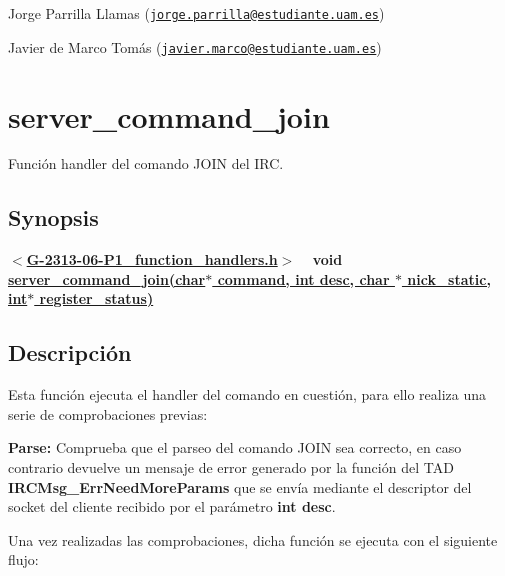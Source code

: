 \begin{DoxyItemize}
\item Jorge Parrilla Llamas (\href{mailto:jorge.parrilla@estudiante.uam.es}{\tt jorge.\+parrilla@estudiante.\+uam.\+es}) 
\item Javier de Marco Tomás (\href{mailto:javier.marco@estudiante.uam.es}{\tt javier.\+marco@estudiante.\+uam.\+es}) 
\end{DoxyItemize}\hypertarget{server_command_join}{}\section{server\+\_\+command\+\_\+join}\label{server_command_join}
Función handler del comando J\+O\+IN del I\+RC.\hypertarget{server_command_join_synopsis_join}{}\subsection{Synopsis}\label{server_command_join_synopsis_join}
{ {\bfseries $<$\hyperlink{G-2313-06-P1__function__handlers_8h}{G-\/2313-\/06-\/\+P1\+\_\+function\+\_\+handlers.\+h}$>$} ~\newline
 {\bfseries void \hyperlink{G-2313-06-P1__function__handlers_8c_a375c143c5469d1bb4fa7793b310ad68e}{server\+\_\+command\+\_\+join(char$\ast$ command, int desc, char $\ast$ nick\+\_\+static, int$\ast$ register\+\_\+status)}} } \hypertarget{server_command_join_descripcion_join}{}\subsection{Descripción}\label{server_command_join_descripcion_join}
Esta función ejecuta el handler del comando en cuestión, para ello realiza una serie de comprobaciones previas\+:


\begin{DoxyItemize}
\item {\bfseries Parse\+:} Comprueba que el parseo del comando J\+O\+IN sea correcto, en caso contrario devuelve un mensaje de error generado por la función del T\+AD {\bfseries I\+R\+C\+Msg\+\_\+\+Err\+Need\+More\+Params} que se envía mediante el descriptor del socket del cliente recibido por el parámetro {\bfseries int desc}. 
\end{DoxyItemize}

Una vez realizadas las comprobaciones, dicha función se ejecuta con el siguiente flujo\+:


